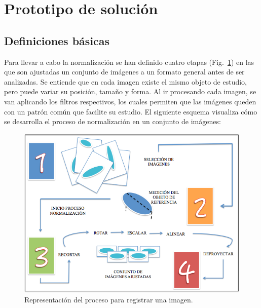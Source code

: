\section{Prototipo de solución}
\subsection{Definiciones básicas}

Para llevar a cabo la normalización se han definido cuatro etapas
(Fig.~\ref{img:represent}) en las que son ajustadas un conjunto de
imágenes a un formato general antes de ser analizadas. Se entiende que
en cada imagen existe el mismo objeto de estudio, pero puede variar su
posición, tamaño y forma. Al ir procesando cada imagen, se van
aplicando los filtros respectivos, los cuales permiten que las
imágenes queden con un patrón común que facilite su estudio. El
siguiente esquema visualiza cómo se desarrolla el proceso de
normalización en un conjunto de imágenes:

\begin{figure}[hb!]
  \begin{center}
    \includegraphics[scale=.5]{image/representacion}
  \end{center}
  \caption{Representación del proceso para registrar una
  imagen.}\label{img:represent}
\end{figure}

